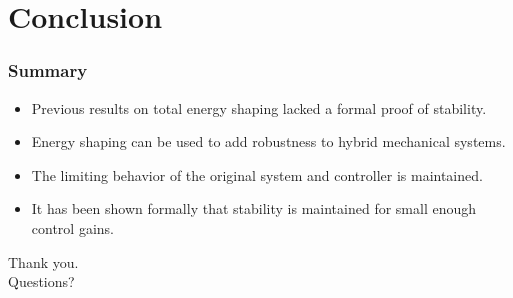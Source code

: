 \section{Conclusion}
\showtoc

\begin{frame}[t]
  \frametitle{Summary}
  \begin{itemize}
  \item Previous results on total energy shaping lacked a formal proof of
    stability.
  \item Energy shaping can be used to add robustness to hybrid mechanical
    systems.
  \item The limiting behavior of the original system and controller is
    maintained.
  \item It has been shown formally that stability is maintained for small enough
    control gains.
  \end{itemize}
\end{frame}

\begin{frame}
  \centering
  \LARGE{Thank you.}\\[5em]
  \LARGE{Questions?}
\end{frame}
